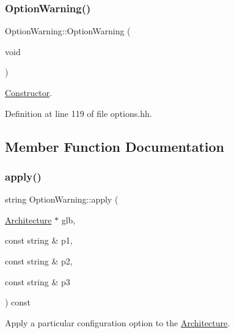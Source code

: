 \subsubsection{\texorpdfstring{OptionWarning()}{OptionWarning()}}
{\footnotesize\ttfamily Option\+Warning\+::\+Option\+Warning (\begin{DoxyParamCaption}\item[{void}]{ }\end{DoxyParamCaption})\hspace{0.3cm}{\ttfamily [inline]}}



\mbox{\hyperlink{class_constructor}{Constructor}}. 



Definition at line 119 of file options.\+hh.



\subsection{Member Function Documentation}
\mbox{\label{class_option_warning_af3b3ebf05120fe85d740e03a2e27b644}} 
\subsubsection{\texorpdfstring{apply()}{apply()}}
{\footnotesize\ttfamily string Option\+Warning\+::apply (\begin{DoxyParamCaption}\item[{\mbox{\hyperlink{class_architecture}{Architecture}} $\ast$}]{glb,  }\item[{const string \&}]{p1,  }\item[{const string \&}]{p2,  }\item[{const string \&}]{p3 }\end{DoxyParamCaption}) const\hspace{0.3cm}{\ttfamily [virtual]}}



Apply a particular configuration option to the \mbox{\hyperlink{class_architecture}{Architecture}}. 

